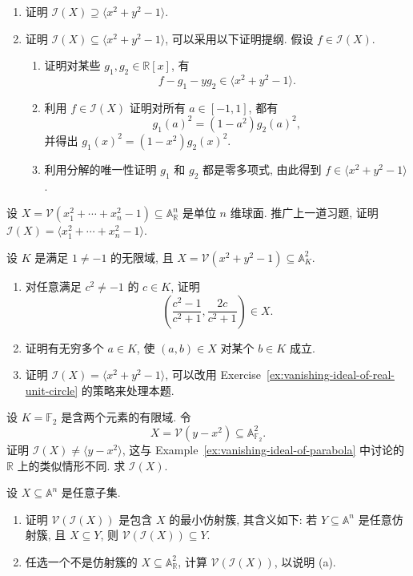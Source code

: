 \begin{BookExercises}
    \begin{enumerate}[label=(\alph*)]
      \item 证明 $\mathcal{I}(X)\supseteq\langle x^{2}+y^{2}-1\rangle$.
      \item 证明 $\mathcal{I}(X)\subseteq\langle x^{2}+y^{2}-1\rangle$, 可以采用以下证明提纲. 假设 $f\in\mathcal{I}(X)$.
        \begin{enumerate}[label=\roman*.]
          \item 证明对某些 $g_{1},g_{2}\in\mathbb{R}[x]$, 有
            \[
              f-g_{1}-yg_{2}\in\langle x^{2}+y^{2}-1\rangle.
            \]
          \item 利用 $f\in\mathcal{I}(X)$ 证明对所有 $a\in[-1,1]$, 都有
            \[
              g_{1}(a)^{2}=(1-a^{2})g_{2}(a)^{2},
            \]
            并得出 $g_{1}(x)^{2}=(1-x^{2})g_{2}(x)^{2}$.
          \item 利用分解的唯一性证明 $g_{1}$ 和 $g_{2}$ 都是零多项式, 由此得到 $f\in\langle x^{2}+y^{2}-1\rangle$.
        \end{enumerate}
    \end{enumerate}
  \item\label{ex:vanishing-ideal-of-unit-n-sphere} 设 $X=\mathcal{V}(x_{1}^{2}+\cdots+x_{n}^{2}-1)\subseteq\mathbb{A}^{n}_{\mathbb{R}}$ 是单位 $n$ 维球面. 推广上一道习题, 证明 $\mathcal{I}(X)=\langle x_{1}^{2}+\cdots+x_{n}^{2}-1\rangle$.
  \item\label{ex:unit-circle-infinite-field} 设 $K$ 是满足 $1\ne-1$ 的无限域, 且 $X=\mathcal{V}(x^{2}+y^{2}-1)\subseteq\mathbb{A}^{2}_{K}$.
    \begin{enumerate}[label=(\alph*)]
      \item 对任意满足 $c^{2}\ne-1$ 的 $c\in K$, 证明
        \[
          \left(\frac{c^{2}-1}{c^{2}+1},\frac{2c}{c^{2}+1}\right)\in X.
        \]
      \item 证明有无穷多个 $a\in K$, 使 $(a,b)\in X$ 对某个 $b\in K$ 成立.
      \item 证明 $\mathcal{I}(X)=\langle x^{2}+y^{2}-1\rangle$, 可以改用 Exercise~\ref{ex:vanishing-ideal-of-real-unit-circle} 的策略来处理本题.
    \end{enumerate}
  \item\label{ex:parabola-vanishing-ideal-over-f2} 设 $K=\mathbb{F}_{2}$ 是含两个元素的有限域. 令
    \[
      X=\mathcal{V}(y-x^{2})\subseteq\mathbb{A}^{2}_{\mathbb{F}_{2}}.
    \]
    证明 $\mathcal{I}(X)\ne\langle y-x^{2}\rangle$, 这与 Example~\ref{ex:vanishing-ideal-of-parabola} 中讨论的 $\mathbb{R}$ 上的类似情形不同. 求 $\mathcal{I}(X)$.
  \item\label{ex:smallest-affine-variety-containing-set} 设 $X\subseteq\mathbb{A}^{n}$ 是任意子集.
    \begin{enumerate}[label=(\alph*)]
      \item 证明 $\mathcal{V}(\mathcal{I}(X))$ 是包含 $X$ 的最小仿射簇, 其含义如下: 若 $Y\subseteq\mathbb{A}^{n}$ 是任意仿射簇, 且 $X\subseteq Y$, 则 $\mathcal{V}(\mathcal{I}(X))\subseteq Y$.
      \item 任选一个不是仿射簇的 $X\subseteq\mathbb{A}^{2}_{\mathbb{R}}$, 计算 $\mathcal{V}(\mathcal{I}(X))$, 以说明 (a).
    \end{enumerate}
\end{BookExercises}
